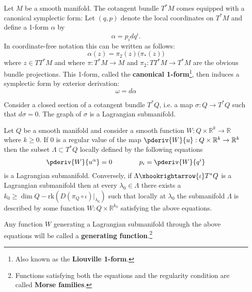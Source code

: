 	\begin{construct}
		Let $M$ be a smooth manifold. The cotangent bundle $T^*M$ comes equipped with a canonical symplectic form: Let $(q, p)$ denote the local coordinates on $T^*M$ and define a 1-form $\alpha$ by \[\alpha = p_idq^i.\] In coordinate-free notation this can be written as follows:
		\begin{equation}
			\alpha(z) = \pi_2(z)\Big(\pi_*(z)\Big)
		\end{equation}
		where $z\in TT^*M$ and where $\pi: T^*M\rightarrow M$ and $\pi_2:TT^*M\rightarrow T^*M$ are the obvious bundle projections. This 1-form, called the \textbf{canonical 1-form}\footnote{Also known as the \textbf{Liouville 1-form}.}, then induces a symplectic form by exterior derivation: \[\omega = d\alpha\]
	\end{construct}
	
	\begin{property}
		Consider a closed section of a cotangent bundle $T^*Q$, i.e. a map $\sigma:Q\rightarrow T^*Q$ such that $d\sigma=0$. The graph of $\sigma$ is a Lagrangian submanifold.
	\end{property}
	
	\begin{theorem}
		Let $Q$ be a smooth manifold and consider a smooth function $W:Q\times\mathbb{R}^k\rightarrow\mathbb{R}$ where $k\geq 0$. If 0 is a regular value of the map $\pderiv{W}{u}:Q\times\mathbb{R}^k\rightarrow\mathbb{R}^k$ then the subset $\Lambda\subset T^*Q$ locally defined by the following equations
		\begin{gather}
			\pderiv{W}{u^\alpha} = 0\qquad\qquad p_i=\pderiv{W}{q^i}
		\end{gather}
		is a Lagrangian submanifold. Conversely, if $\Lambda\xhookrightarrow{\iota}T^*Q$ is a Lagrangian submanifold then at every $\lambda_0\in\Lambda$ there exists a $k_0\geq\dim Q - \text{rk}\left(D(\pi_Q\circ\iota)|_{\lambda_0}\right)$ such that locally at $\lambda_0$ the submanifold $\Lambda$ is described by some function $W:Q\times\mathbb{R}^{k_0}$ satisfying the above equations.
	\end{theorem}
	Any function $W$ generating a Lagrangian submanifold through the above equations will be called a \textbf{generating function}.\footnote{Functions satisfying both the equations and the regularity condition are called \textbf{Morse families}.}


